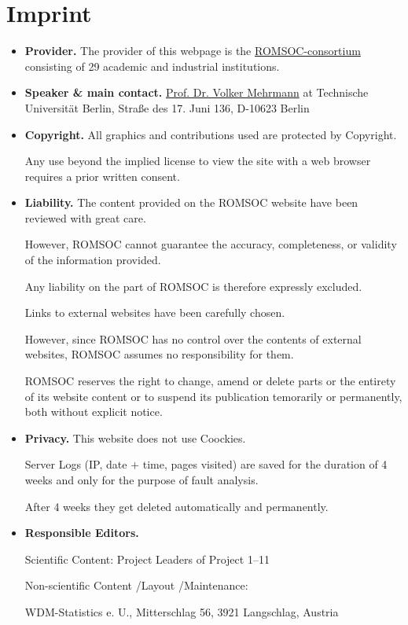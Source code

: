 \documentclass[onsided]{book}
\numberwithin{equation}{section}
\begin{document}
\section{Imprint}
\begin{itemize}
    \item \textbf{Provider.} The provider of this webpage is the \href{https://www.romsoc.eu/consortium/}{ROMSOC-consortium} consisting of 29 academic and industrial institutions.
    \item \textbf{Speaker \& main contact.} \href{https://www.romsoc.eu/contact/}{Prof. Dr. Volker Mehrmann} at Technische Universität Berlin, Straße des 17. Juni 136, D-10623 Berlin
    \item \textbf{Copyright.} All graphics and contributions used are protected by Copyright.
    
    Any use beyond the implied license to view the site with a web browser requires a prior written consent.
    \item \textbf{Liability.} The content provided on the ROMSOC website have been reviewed with great care.
    
    However, ROMSOC cannot guarantee the accuracy, completeness, or validity of the information provided.
    
    Any liability on the part of ROMSOC is therefore expressly excluded.
    
    Links to external websites have been carefully chosen.
    
    However, since ROMSOC has no control over the contents of external websites, ROMSOC assumes no responsibility for them.
    
    ROMSOC reserves the right to change, amend or delete parts or the entirety of its website content or to suspend its publication temorarily or permanently, both without explicit notice.
    \item \textbf{Privacy.} This website does not use Coockies.
    
    Server Logs (IP, date $+$ time, pages visited) are saved for the duration of 4 weeks and only for the purpose of fault analysis.
    
    After 4 weeks they get deleted automatically and permanently.
    \item \textbf{Responsible Editors.}
    
    Scientific Content: Project Leaders of Project 1--11
    
    Non-scientific Content /Layout /Maintenance:
    
    WDM-Statistics e. U., Mitterschlag 56, 3921 Langschlag, Austria
\end{itemize}
\end{document}
